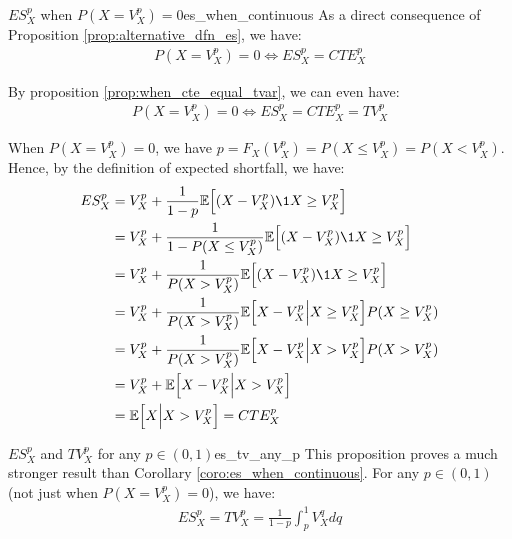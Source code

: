 \begin{corollary}{$ES_X^p$ when $P(X=V_X^p) = 0$}{es_when_continuous}
    As a direct consequence of Proposition \ref{prop:alternative_dfn_es}, we have:
    \begin{align*}
        P(X=V_X^p) = 0 \iff ES_X^p = CTE_X^p
    \end{align*}

    \noindent By proposition \ref{prop:when_cte_equal_tvar}, we can even have:
    \begin{align*}
        P(X=V_X^p) = 0 \iff ES_X^p = CTE_X^p = TV_X^p
    \end{align*}
\end{corollary}

\begin{proof*}
    When $P(X=V_X^p) = 0$, we have $p=F_X(V_X^p)=P(X\le V_X^p)=P(X<V_X^p)$. Hence, by the definition of expected shortfall, we have:
    \begin{align*}
        ES_X^p 
        &= V_X^p + \frac{1}{1-p}\mathbb{E}\Big[ (X - V_X^p)\1{X\ge V_X^p} \Big] \\
        &= V_X^p + \frac{1}{1 - P(X \le V_X^p)}\mathbb{E}\Big[ (X - V_X^p)\1{X\ge V_X^p} \Big] \\
        &= V_X^p + \frac{1}{P(X > V_X^p)}\mathbb{E}\Big[ (X - V_X^p)\1{X\ge V_X^p} \Big] \\
        &= V_X^p + \frac{1}{P(X > V_X^p)}\mathbb{E}\Big[ X - V_X^p \Big| X \ge V_X^p \Big] P(X\ge V_X^p) \\
        &= V_X^p + \frac{1}{P(X > V_X^p)}\mathbb{E}\Big[ X - V_X^p \Big| X > V_X^p \Big] P(X > V_X^p) \\
        &= V_X^p + \mathbb{E}\Big[ X - V_X^p \Big| X > V_X^p \Big] \\
        &= \mathbb{E}\Big[ X \Big| X > V_X^p \Big] = CTE_X^p
    \end{align*}
\end{proof*}

\begin{proposition}{$ES_X^p$ and $TV_X^p$ for any $p\in(0,1)$}{es_tv_any_p}
    This proposition proves a much stronger result than Corollary \ref{coro:es_when_continuous}. For any $p\in(0,1)$ (not just when $P(X = V_X^p) = 0$), we have:
    \begin{align*}
        ES_X^p = TV_X^p = \frac{1}{1-p}\int_p^1 V_X^qdq
    \end{align*}
\end{proposition}

